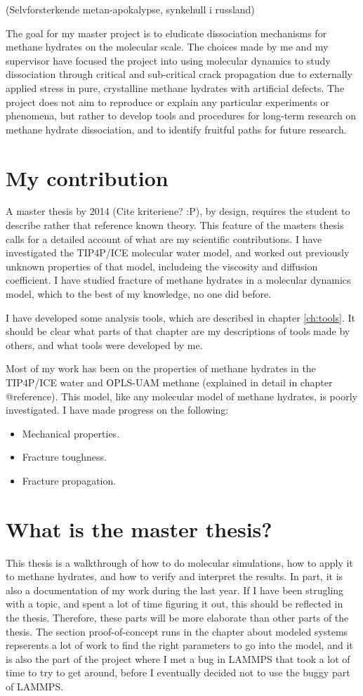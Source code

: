 (Selvforsterkende metan-apokalypse, synkehull i russland)

The goal for my master project is to eludicate dissociation mechanisms for methane hydrates on the molecular scale. The choices made by me and my supervisor have focused the project into using molecular dynamics to study dissociation through critical and sub-critical crack propagation due to externally applied stress in pure, crystalline methane hydrates with artificial defects. The project does not aim to reproduce or explain any particular experiments or phenomena, but rather to develop tools and procedures for long-term research on methane hydrate dissociation, and to identify fruitful paths for future research.


\section{My contribution}
A master thesis by 2014 (Cite kriteriene? :P), by design, requires the student to describe rather that reference known theory. This feature of the masters thesis calls for a detailed account of what are my scientific contributions. I have investigated the TIP4P/ICE molecular water model, and worked out previously unknown properties of that model, includeing the viscosity and diffusion coefficient. I have studied fracture of methane hydrates in a molecular dynamics model, which to the best of my knowledge, no one did before. 

I have developed some analysis tools, which are described in chapter \ref{ch:tools}. It should be clear what parts of that chapter are my descriptions of tools made by others, and what tools were developed by me.

Most of my work has been on the properties of methane hydrates in the  TIP4P/ICE water and OPLS-UAM methane (explained in detail in chapter @reference). This model, like any molecular model of methane hydrates, is poorly investigated. I have made progress on the following:
\begin{itemize}
\item Mechanical properties.
\item Fracture toughness.
\item Fracture propagation.
\end{itemize}


\section{What is the master thesis?}
This thesis is a walkthrough of how to do molecular simulations, how to apply it to methane hydrates, and how to verify and interpret the results. In part, it is also a documentation of my work during the last year. If I have been strugling with a topic, and spent a lot of time figuring it out, this should be reflected in the thesis. Therefore, these parts will be more elaborate than other parts of the thesis. The section proof-of-concept runs in the chapter about modeled systems repserents a lot of work to find the right parameters to go into the model, and it is also the part of the project where I met a bug in LAMMPS that took a lot of time to try to get around, before I eventually decided not to use the buggy part of LAMMPS.


